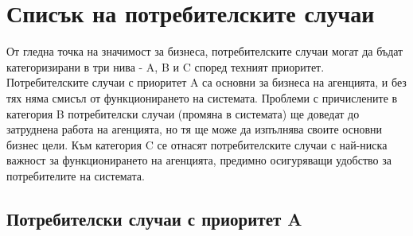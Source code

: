 \documentclass[a4paper]{article}
\begin{document}
\section{Списък на потребителските случаи}

От гледна точка на значимост за бизнеса, потребителските случаи могат да бъдат категоризирани в три нива - A, B и C според техният приоритет. Потребителските случаи с приоритет A са основни за бизнеса на агенцията, и без тях няма смисъл от функционирането на системата. Проблеми с причислените в категория B потребителски случаи (промяна в системата) ще доведат до затруднена работа на агенцията, но тя ще може да изпълнява своите основни бизнес цели. Към категория C се отнасят потребителските случаи с най-ниска важност за функционирането на агенцията, предимно осигуряващи удобство за потребителите на системата.

\subsection{Потребителски случаи с приоритет A}
\end{document}
